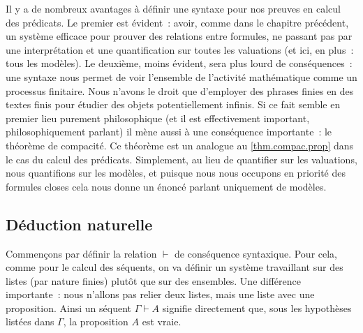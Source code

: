 Il y a de nombreux avantages à définir une syntaxe pour nos preuves en calcul
des prédicats. Le premier est évident~: avoir, comme dans le chapitre précédent,
un système efficace pour prouver des relations entre formules, ne passant pas
par une interprétation et une quantification sur toutes les valuations (et ici,
en plus~: tous les modèles). Le deuxième, moins évident, sera plus lourd de
conséquences~: une syntaxe nous permet de voir l'ensemble de l'activité
mathématique comme un processus finitaire. Nous n'avons le droit que d'employer
des phrases finies en des textes finis pour étudier des objets potentiellement
infinis. Si ce fait semble en premier lieu purement philosophique (et il est
effectivement important, philosophiquement parlant) il mène aussi à une
conséquence importante~: le théorème de compacité. Ce théorème est un analogue
au \cref{thm.compac.prop} dans le cas du calcul des prédicats. Simplement, au
lieu de quantifier sur les valuations, nous quantifions sur les modèles, et
puisque nous nous occupons en priorité des formules closes cela nous donne un
énoncé parlant uniquement de modèles.

\subsection{Déduction naturelle}

Commençons par définir la relation $\vdash$ de conséquence syntaxique. Pour
cela, comme pour le calcul des séquents, on va définir un système travaillant
sur des listes (par nature finies) plutôt que sur des ensembles. Une différence
importante~: nous n'allons pas relier deux listes, mais une liste avec une
proposition. Ainsi un séquent $\Gamma\vdash A$ signifie directement que, sous
les hypothèses listées dans $\Gamma$, la proposition $A$ est vraie.

